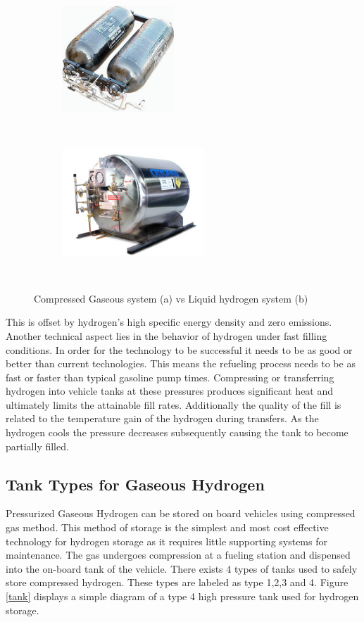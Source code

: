 \documentclass[paper=a4, fontsize=11pt, abstract=on]{scrartcl}
\numberwithin{equation}{section}		%
\numberwithin{figure}{section}			%
\numberwithin{table}{section}				%
\begin{document}
\begin{figure}[H]
        
        \begin{subfigure}[H]{0.45\textwidth}
        \centering
                \includegraphics[height = 4.0cm]{tank1}
                \caption{}				
        \end{subfigure}%
       ~~~~~
        \begin{subfigure}[h]{0.45\textwidth}
        \centering
                \includegraphics[height = 4.0cm]{cry}
                \caption{}
                
        \end{subfigure}
        ~~~~~
        \caption{Compressed Gaseous system (a) vs Liquid hydrogen system (b)}
        \label{results}
\end{figure}

This is offset by hydrogen's high specific energy density and zero emissions. Another technical aspect lies in the behavior of hydrogen under fast filling conditions. In order for the technology to be successful it needs to be as good or better than current technologies. This means the refueling process needs to be as fast or faster than typical gasoline pump times. Compressing or transferring hydrogen into vehicle tanks at these pressures produces significant heat and ultimately limits the attainable fill rates. Additionally the quality of the fill is related to the temperature gain of the hydrogen during transfers. As the hydrogen cools the pressure decreases subsequently causing the tank to become partially filled.  

\subsection{Tank Types for Gaseous Hydrogen}
Pressurized Gaseous Hydrogen can be stored on board vehicles using compressed gas method. This method of storage is the simplest and most cost effective technology for hydrogen storage as it requires little supporting systems for maintenance. The gas undergoes compression at a fueling station and dispensed into the on-board tank of the vehicle. There exists 4 types of tanks used to safely store compressed hydrogen. These types are labeled as type 1,2,3 and 4. Figure \ref{tank} displays a simple diagram of a type 4 high pressure tank used for hydrogen storage.
\end{document}
